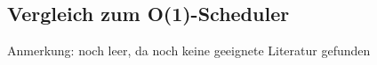 \subsection{Vergleich zum O(1)-Scheduler}\label{s:compO1}
Anmerkung: noch leer, da noch keine geeignete Literatur gefunden
